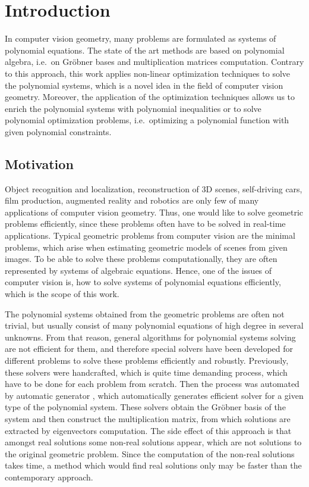 \chapter{Introduction}
In computer vision geometry, many problems are formulated as systems of polynomial equations.
The state of the art methods are based on polynomial algebra, i.e.\ on Gr\"obner bases and multiplication matrices computation.
Contrary to this approach, this work applies non-linear optimization techniques to solve the polynomial systems, which is a novel idea in the field of computer vision geometry.
Moreover, the application of the optimization techniques allows us to enrich the polynomial systems with polynomial inequalities or to solve polynomial optimization problems, i.e.\ optimizing a polynomial function with given polynomial constraints.

\section{Motivation}
Object recognition and localization, reconstruction of 3D scenes, self-driving cars, film production, augmented reality and robotics are only few of many applications of computer vision geometry.
Thus, one would like to solve geometric problems efficiently, since these problems often have to be solved in real-time applications.
Typical geometric problems from computer vision are the minimal problems, which arise when estimating geometric models of scenes from given images.
To be able to solve these problems computationally, they are often represented by systems of algebraic equations.
Hence, one of the issues of computer vision is, how to solve systems of polynomial equations efficiently, which is the scope of this work.

The polynomial systems obtained from the geometric problems are often not trivial, but usually consist of many polynomial equations of high degree in several unknowns.
From that reason, general algorithms for polynomial systems solving are not efficient for them, and therefore special solvers have been developed for different problems to solve these problems efficiently and robustly.
Previously, these solvers were handcrafted, which is quite time demanding process, which have to be done for each problem from scratch.
Then the process was automated by automatic generator \cite{autogen}, which automatically generates efficient solver for a given type of the polynomial system.
These solvers obtain the Gr\"obner basis of the system and then construct the multiplication matrix, from which solutions are extracted by eigenvectors computation.
The side effect of this approach is that amongst real solutions some non-real solutions appear, which are not solutions to the original geometric problem.
Since the computation of the non-real solutions takes time, a method which would find real solutions only may be faster than the contemporary approach.

